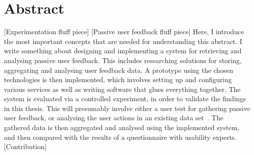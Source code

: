 %
\chapter*{Abstract}
\label{sec:abstract}
\vspace*{-10mm}

[Experimentation fluff piece]
[Passive user feedback fluff piece]
Here, I introduce the most important concepts that are needed for understanding this abstract.
I write something about designing and implementing a system for retrieving and analysing passive user feedback.
This includes researching solutions for storing, aggregating and analysing user feedback data.
A prototype using the chosen technologies is then implemented, which involves setting up and configuring various services as well as writing software that glues everything together.
The system is evaluated via a controlled experiment, in order to validate the findings in this thesis.
This will presumably involve either a user test  for gathering passive user feedback, or analysing the user actions in an existing data set~\cite{Deka:2017:Rico}.
The gathered data is then aggregated and analysed using the implemented system, and then compared with the results of a questionnaire with usability experts.
[Contribution]
